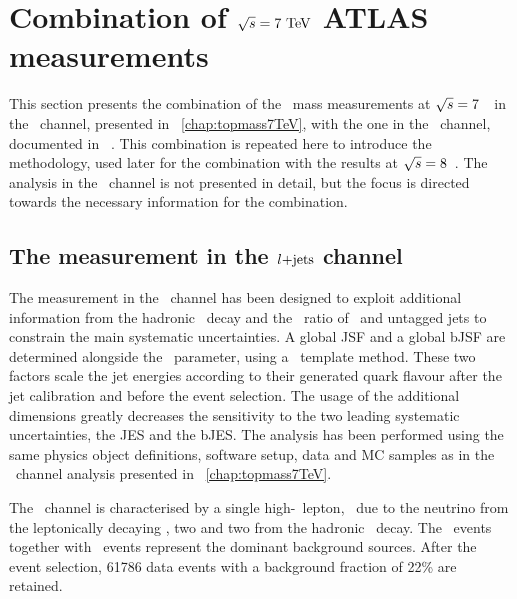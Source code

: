 \section[Combination of \texorpdfstring{$\sqrts=7$}{sqrt(s)=7}~\TeV\ ATLAS measurements]{Combination of \texorpdfstring{\boldmath${\sqrt{s}}=7~\mathrm{TeV}$}{sqrt(s)=7~\TeV} ATLAS measurements}
\label{sec:resultcomb7TeV}
%
This section presents the combination of the \tquark\ mass measurements at $\sqrts=7$~\TeV\ in the \dil\ channel, presented in \chap~\ref{chap:topmass7TeV}, with the one in the \ljets\ channel, documented in ~\cite{Aad:2015nba}. 
%
This combination is repeated here to introduce the methodology, used later for the combination with the results at ${\sqrt{s}}=8$~\TeV. The analysis in the \ljets\ channel is not presented in detail, but the focus is directed towards the necessary information for the combination. 



\subsection[The measurement in the \ljets\ channel]{The measurement in the \boldmath$l\mbox{+jets}$ channel}
\label{sec:ljanalysis7TeV}
%
The measurement in the \ljets\ channel has been designed to exploit additional information from the hadronic \Wboson\ decay and the \pt\ ratio of \btagged\ and untagged jets to constrain the main systematic uncertainties. A global \gls{JSF} and a global \gls{bJSF} are determined alongside the \mt\ parameter, using a \threed\ template method. 
%
These two factors scale the jet energies according to their generated quark flavour after the jet calibration and before the event selection. 
%
The usage of the additional dimensions greatly decreases the sensitivity to the two leading systematic uncertainties, the \gls{JES} and the \gls{bJES}. 
%
The analysis has been performed using the same physics object definitions, software setup, data and \gls{MC} samples as in the \dil\ channel analysis presented in \chap~\ref{chap:topmass7TeV}. 




The \ttbarlj\ channel is characterised by a single high-\pt\ lepton, \met\ due to the neutrino from the leptonically decaying \Wboson, two  and two  from the hadronic \Wboson\ decay. 
%
The \Wj\ events together with \fake\ events represent the dominant background sources. 
%
After the event selection, 61786 data events with a background fraction of 22\% are retained. 





